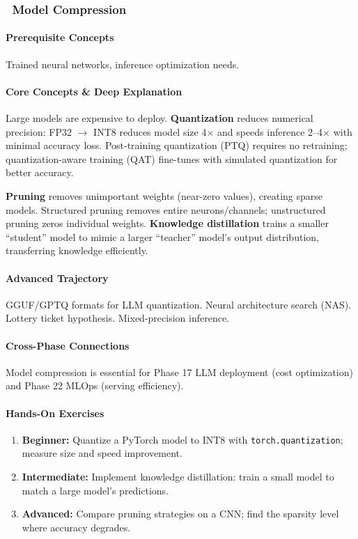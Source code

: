\documentclass[11pt, a4paper, oneside]{report}
\newcommand{\mustmaster}[1]{\subsubsection{\texorpdfstring{\fcolorbox{blue!40!black}{blue!8}{\footnotesize\bfseries\color{blue!40!black} MUST MASTER}~#1}{#1}}}
\newcommand{\arrow}{$\rightarrow$}
\begin{document}
\mustmaster{Model Compression}

\paragraph{Prerequisite Concepts} Trained neural networks, inference optimization needs.

\paragraph{Core Concepts \& Deep Explanation} Large models are expensive to deploy. \textbf{Quantization} reduces numerical precision: FP32 \arrow{} INT8 reduces model size 4$\times$ and speeds inference 2--4$\times$ with minimal accuracy loss. Post-training quantization (PTQ) requires no retraining; quantization-aware training (QAT) fine-tunes with simulated quantization for better accuracy.

\textbf{Pruning} removes unimportant weights (near-zero values), creating sparse models. Structured pruning removes entire neurons/channels; unstructured pruning zeros individual weights. \textbf{Knowledge distillation} trains a smaller ``student'' model to mimic a larger ``teacher'' model's output distribution, transferring knowledge efficiently.

\paragraph{Advanced Trajectory} GGUF/GPTQ formats for LLM quantization. Neural architecture search (NAS). Lottery ticket hypothesis. Mixed-precision inference.

\paragraph{Cross-Phase Connections} Model compression is essential for Phase 17 LLM deployment (cost optimization) and Phase 22 MLOps (serving efficiency).

\paragraph{Hands-On Exercises}
\begin{enumerate}[leftmargin=*]
\item \textbf{Beginner:} Quantize a PyTorch model to INT8 with \texttt{torch.quantization}; measure size and speed improvement.
\item \textbf{Intermediate:} Implement knowledge distillation: train a small model to match a large model's predictions.
\item \textbf{Advanced:} Compare pruning strategies on a CNN; find the sparsity level where accuracy degrades.
\end{enumerate}
\end{document}

